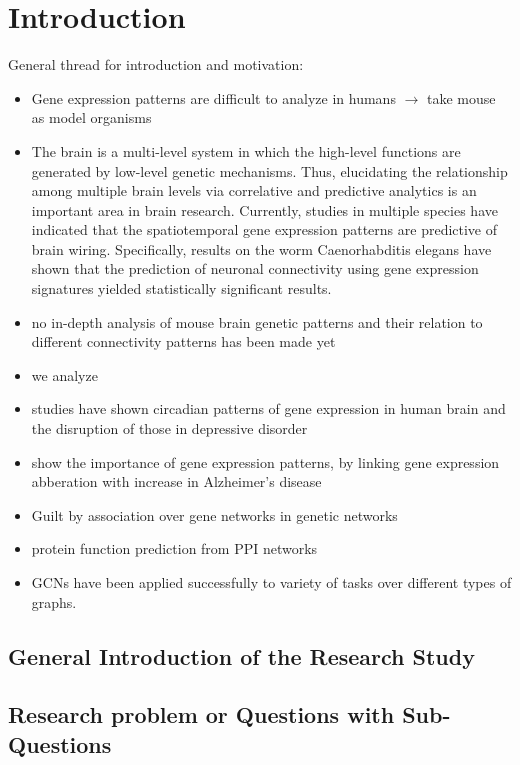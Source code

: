 \documentclass[]{article}
\renewcommand{\cite}{\citep}
\begin{document}
\section{Introduction}
\label{sec:introduction}
General thread for introduction and motivation:
\begin{itemize}
	\item Gene expression patterns are difficult to analyze in humans $\rightarrow$ take mouse as model organisms
	\item The brain is a multi-level system in which the high-level functions are generated by low-level genetic mechanisms. Thus, elucidating the relationship among multiple brain levels via correlative and predictive analytics is an important area in brain research. Currently, studies in multiple species have indicated that the spatiotemporal gene expression patterns are predictive of brain wiring. Specifically, results on the worm Caenorhabditis elegans have shown that the prediction of neuronal connectivity using gene expression signatures yielded statistically significant results.
	\item no in-depth analysis of mouse brain genetic patterns and their relation to different connectivity patterns has been made yet
	\item we analyze 
	
	\item studies have shown circadian patterns of gene expression in human brain and the disruption of those in depressive disorder \cite{li2013circadian}
	\item \cite{twine2011whole} show the importance of gene expression patterns, by linking gene expression abberation with increase in Alzheimer's disease
	
	\item Guilt by association over gene networks \cite{Oliver2000, Gillis2012} in genetic networks
	\item protein function prediction from PPI networks \cite{Vazquez2003}
	\item GCNs have been applied successfully to variety of tasks over different types of graphs.
\end{itemize}

\subsection*{General Introduction of the Research Study}

\subsection*{Research problem or Questions with Sub-Questions}
\end{document}
